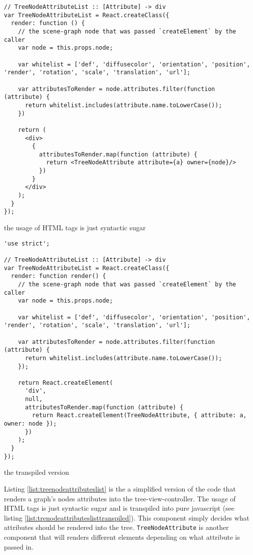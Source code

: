 \begin{listing}
  \begin{verbatim}
// TreeNodeAttributeList :: [Attribute] -> div
var TreeNodeAttributeList = React.createClass({
  render: function () {
    // the scene-graph node that was passed `createElement` by the caller
    var node = this.props.node;

    var whitelist = ['def', 'diffusecolor', 'orientation', 'position', 'render', 'rotation', 'scale', 'translation', 'url'];

    var attributesToRender = node.attributes.filter(function (attribute) {
      return whitelist.includes(attribute.name.toLowerCase());
    })

    return (
      <div>
        {
          attributesToRender.map(function (attribute) {
            return <TreeNodeAttribute attribute={a} owner={node}/>
          })
        }
      </div>
    );
  }
});
  \end{verbatim}
  \caption{the usage of HTML tags is just syntactic sugar}
  \label{list:treenodeattributeslist}
\end{listing}

\begin{listing}
  \begin{verbatim}
'use strict';

// TreeNodeAttributeList :: [Attribute] -> div
var TreeNodeAttributeList = React.createClass({
  render: function render() {
    // the scene-graph node that was passed `createElement` by the caller
    var node = this.props.node;

    var whitelist = ['def', 'diffusecolor', 'orientation', 'position', 'render', 'rotation', 'scale', 'translation', 'url'];

    var attributesToRender = node.attributes.filter(function (attribute) {
      return whitelist.includes(attribute.name.toLowerCase());
    });

    return React.createElement(
      'div',
      null,
      attributesToRender.map(function (attribute) {
        return React.createElement(TreeNodeAttribute, { attribute: a, owner: node });
      })
    );
  }
});
  \end{verbatim}
  \caption{the transpiled version}
  \label{list:trenodeattributeslisttranspiled}
\end{listing}

Listing \ref{list:treenodeattributeslist} is the a simplified version of the code that renders a
graph's nodes attributes into the tree-view-controller.
The usage of HTML tags is just syntactic sugar and is transpiled into pure javascript (see listing \ref{list:trenodeattributeslisttranspiled}).
This component simply decides what attributes should be rendered into the tree.
\texttt{TreeNodeAttribute} is another component that will renders
different elements depending on what attribute is passed in.

